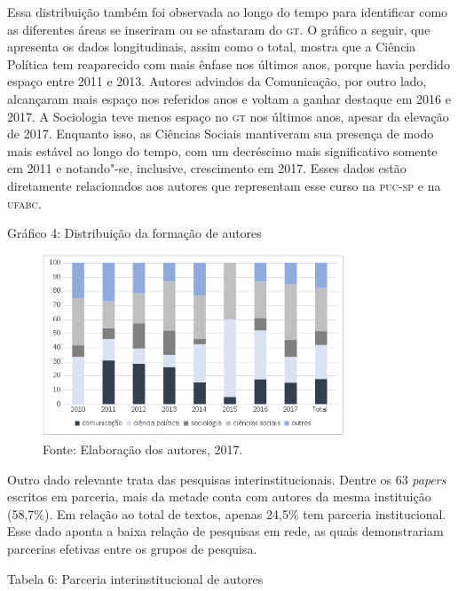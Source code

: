 Essa distribuição também foi observada ao longo do tempo para
identificar como as diferentes áreas se inseriram ou se afastaram do \textsc{gt}.
O gráfico a seguir, que apresenta os dados longitudinais, assim como o
total, mostra que a Ciência Política tem reaparecido com mais ênfase nos
últimos anos, porque havia perdido espaço entre 2011 e 2013. Autores
advindos da Comunicação, por outro lado, alcançaram mais espaço nos
referidos anos e voltam a ganhar destaque em 2016 e 2017. A Sociologia
teve menos espaço no \textsc{gt} nos últimos anos, apesar da elevação de 2017.
Enquanto isso, as Ciências Sociais mantiveram sua presença de modo mais
estável ao longo do tempo, com um decréscimo mais significativo somente
em 2011 e notando"-se, inclusive, crescimento em 2017. Esses dados estão
diretamente relacionados aos autores que representam esse curso na
\textsc{puc}-\textsc{sp} e na \textsc{ufabc}.


\begin{center}
Gráfico 4: Distribuição da formação de autores
\end{center}

\begin{figure}[!ht]
\centering
 \includegraphics[width=90mm]{./imgs/graf3_4.png}
\caption{Fonte: Elaboração dos autores, 2017.}
\end{figure}

Outro dado relevante trata das pesquisas interinstitucionais. Dentre os
63 \emph{papers} escritos em parceria, mais da metade conta com
autores da mesma instituição (58,7\%). Em relação ao total de textos,
apenas 24,5\% tem parceria institucional. Esse dado aponta a baixa
relação de pesquisas em rede, as quais demonstrariam parcerias efetivas
entre os grupos de pesquisa.

\begin{center}
Tabela 6: Parceria interinstitucional de autores
\end{center}

